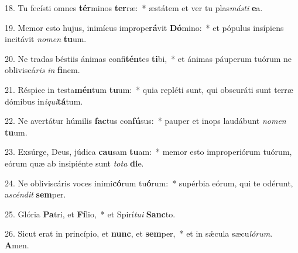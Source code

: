 18. Tu fecísti omnes \textbf{tér}minos \textbf{ter}ræ:~*  æstátem et ver tu plas\textit{más}\textit{ti} \textbf{e}a.\

19. Memor esto hujus, inimícus imprope\textbf{rá}vit \textbf{Dó}mino:~*  et pópulus insípiens incitávit \textit{no}\textit{men} \textbf{tu}um.\

20. Ne tradas béstiis ánimas confi\textbf{tén}tes \textbf{ti}bi,~*  et ánimas páuperum tuórum ne obliviscá\textit{ris} \textit{in} \textbf{fi}nem.\

21. Réspice in testa\textbf{mén}tum \textbf{tu}um:~*  quia repléti sunt, qui obscuráti sunt terræ dómibus in\textit{i}\textit{qui}\textbf{tá}tum.\

22. Ne avertátur húmilis \textbf{fac}tus con\textbf{fú}sus:~*  pauper et inops laudábunt \textit{no}\textit{men} \textbf{tu}um.\

23. Exsúrge, Deus, júdica \textbf{cau}sam \textbf{tu}am:~*  memor esto improperiórum tuórum, eórum quæ ab insipiénte sunt \textit{to}\textit{ta} \textbf{di}e.\

24. Ne obliviscáris voces inimi\textbf{có}rum tu\textbf{ó}rum:~*  supérbia eórum, qui te odérunt, a\textit{scén}\textit{dit} \textbf{sem}per.\

25. Glória \textbf{Pa}tri, et \textbf{Fí}lio,~*  et Spirí\textit{tu}\textit{i} \textbf{Sanc}to.\

26. Sicut erat in princípio, et \textbf{nunc}, et \textbf{sem}per,~*  et in sǽcula sæcu\textit{ló}\textit{rum}. \textbf{A}men.\

